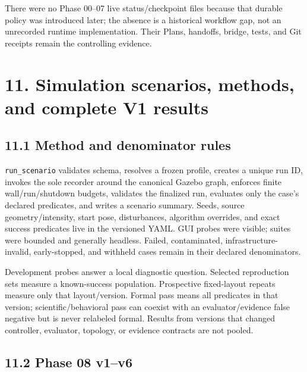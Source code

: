 \documentclass[
  10pt,
  letterpaper,
]{article}
\begin{document}
There were no Phase 00--07 live status/checkpoint files because that durable
policy was introduced later; the absence is a historical workflow gap, not an
unrecorded runtime implementation. Their Plans, handoffs, bridge, tests, and
Git receipts remain the controlling evidence.

\section{11. Simulation scenarios, methods, and complete V1 results}\label{simulation-scenarios-methods-and-complete-v1-results}

\subsection{11.1 Method and denominator rules}\label{method-and-denominator-rules}

\nolinkurl{run\_scenario} validates schema, resolves a frozen profile, creates a unique
run ID, invokes the sole recorder around the canonical Gazebo graph, enforces
finite wall/run/shutdown budgets, validates the finalized run, evaluates only
the case's declared predicates, and writes a scenario summary. Seeds, source
geometry/intensity, start pose, disturbances, algorithm overrides, and exact
success predicates live in the versioned YAML. GUI probes were visible; suites
were bounded and generally headless. Failed, contaminated, infrastructure-
invalid, early-stopped, and withheld cases remain in their declared
denominators.

Development probes answer a local diagnostic question. Selected reproduction
sets measure a known-success population. Prospective fixed-layout repeats
measure only that layout/version. Formal pass means all predicates in that
version; scientific/behavioral pass can coexist with an evaluator/evidence
false negative but is never relabeled formal. Results from versions that
changed controller, evaluator, topology, or evidence contracts are not pooled.

\subsection{11.2 Phase 08 v1--v6}\label{phase-08-v1v6}
\end{document}
